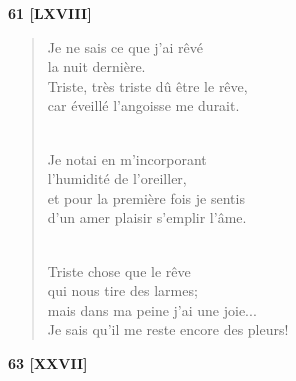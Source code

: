 \documentclass[a4paper,12pt]{book}
\begin{document}
\bigskip

\begin{center} {\bf 61 [LXVIII]} \end{center}

\begin{verse}
Je ne sais ce que j'ai rêvé \\
la nuit dernière. \\
Triste, très triste dû être le rêve, \\
car éveillé l'angoisse me durait. \\ \


Je notai en m'incorporant \\
l'humidité de l'oreiller, \\
et pour la première fois je sentis \\
d'un amer plaisir s'emplir l'âme. \\ \

Triste chose que le rêve \\
qui nous tire des larmes; \\
mais dans ma peine j'ai une joie... \\
Je sais qu'il me reste encore des pleurs! \\
\end{verse}

\bigskip

\begin{center} {\bf 63 [XXVII]} \end{center}
\end{document}
